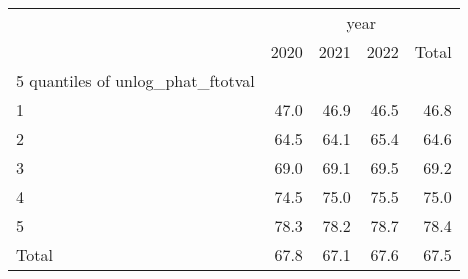 \begin{tabular}{lllll}
\cline{1-5}
\multicolumn{1}{c}{} &
  \multicolumn{4}{|c}{year} \\
\multicolumn{1}{c}{} &
  \multicolumn{1}{|r}{2020} &
  \multicolumn{1}{r}{2021} &
  \multicolumn{1}{r}{2022} &
  \multicolumn{1}{r}{Total} \\
\cline{1-5}
\multicolumn{1}{l}{5 quantiles of unlog\_phat\_ftotval} &
  \multicolumn{1}{|r}{} &
  \multicolumn{1}{r}{} &
  \multicolumn{1}{r}{} &
  \multicolumn{1}{r}{} \\
\multicolumn{1}{l}{\hspace{1em}1} &
  \multicolumn{1}{|r}{47.0} &
  \multicolumn{1}{r}{46.9} &
  \multicolumn{1}{r}{46.5} &
  \multicolumn{1}{r}{46.8} \\
\multicolumn{1}{l}{\hspace{1em}2} &
  \multicolumn{1}{|r}{64.5} &
  \multicolumn{1}{r}{64.1} &
  \multicolumn{1}{r}{65.4} &
  \multicolumn{1}{r}{64.6} \\
\multicolumn{1}{l}{\hspace{1em}3} &
  \multicolumn{1}{|r}{69.0} &
  \multicolumn{1}{r}{69.1} &
  \multicolumn{1}{r}{69.5} &
  \multicolumn{1}{r}{69.2} \\
\multicolumn{1}{l}{\hspace{1em}4} &
  \multicolumn{1}{|r}{74.5} &
  \multicolumn{1}{r}{75.0} &
  \multicolumn{1}{r}{75.5} &
  \multicolumn{1}{r}{75.0} \\
\multicolumn{1}{l}{\hspace{1em}5} &
  \multicolumn{1}{|r}{78.3} &
  \multicolumn{1}{r}{78.2} &
  \multicolumn{1}{r}{78.7} &
  \multicolumn{1}{r}{78.4} \\
\multicolumn{1}{l}{\hspace{1em}Total} &
  \multicolumn{1}{|r}{67.8} &
  \multicolumn{1}{r}{67.1} &
  \multicolumn{1}{r}{67.6} &
  \multicolumn{1}{r}{67.5} \\
\cline{1-5}
\end{tabular}
